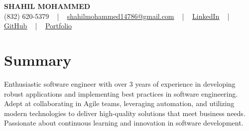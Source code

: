 \documentclass[letterpaper,10pt]{article}
\begin{document}
\begin{center}
    {\fontsize{14pt}{12pt}\selectfont \textbf{\MakeUppercase{Shahil Mohammed}}}\\ \vspace{2pt}
    \fontsize{10pt}{12pt}\selectfont (832) 620-5379 ~ | ~ \href{mailto:shahilmohammed14786@gmail.com}{shahilmohammed14786@gmail.com} ~ | ~  
    \href{https://www.linkedin.com/in/shahil-mohammed-9652931a1/}{\color{blue}\underline{LinkedIn}}  ~ | ~ 
    \href{https://github.com/freakbeast14}{\color{blue}\underline{GitHub}} ~ | ~ 
    \href{https://shahil-mohammed.netlify.app/}{\color{blue}\underline{Portfolio}}
    \vspace{-8pt}
\end{center}

\section{Summary}
\vspace{-2pt}\fontsize{8pt}{9pt}\selectfont
Enthusiastic software engineer with over 3 years of experience in developing robust applications and implementing best practices in software engineering. Adept at collaborating in Agile teams, leveraging automation, and utilizing modern technologies to deliver high-quality solutions that meet business needs. Passionate about continuous learning and innovation in software development.
 \vspace{-5pt}
 
\vspace{-2pt}
\end{document}
